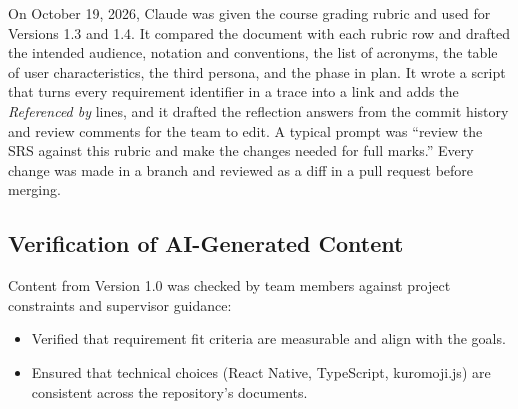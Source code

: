 \documentclass[12pt]{article}
\begin{document}
On October 19, 2026, Claude was given the course grading rubric and used for
Versions 1.3 and 1.4. It compared the document with each rubric row and
drafted the intended audience, notation and conventions, the list of
acronyms, the table of user characteristics, the third persona, and the phase
in plan. It wrote a script that turns every requirement identifier in a trace
into a link and adds the \emph{Referenced by} lines, and it drafted the
reflection answers from the commit history and review comments for the team
to edit. A typical prompt was ``review the SRS against this rubric and make
the changes needed for full marks.'' Every change was made in a branch and
reviewed as a diff in a pull request before merging.

\subsection{Verification of AI-Generated Content}
Content from Version 1.0 was checked by team members against project
constraints and supervisor guidance:
\begin{itemize}
    \item Verified that requirement fit criteria are measurable and align with
          the goals.
    \item Ensured that technical choices (React Native, TypeScript,
          kuromoji.js) are consistent across the repository's documents.
\end{itemize}
\end{document}
